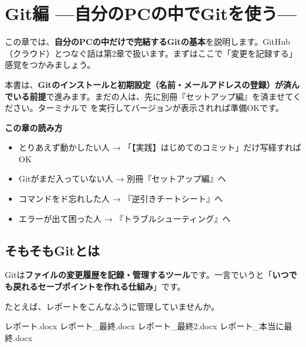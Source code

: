 \chapter{Git編 —自分のPCの中でGitを使う—}

この章では、\textbf{自分のPCの中だけで完結するGitの基本}を説明します。GitHub（クラウド）とつなぐ話は第2章で扱います。まずはここで「変更を記録する」感覚をつかみましょう。

\begin{warnbox}
本書は、\textbf{Gitのインストールと初期設定（名前・メールアドレスの登録）が済んでいる前提}で進みます。まだの人は、先に別冊『セットアップ編』を済ませてください。ターミナルで  を実行してバージョンが表示されれば準備OKです。
\end{warnbox}

\begin{hintbox}
\textbf{この章の読み方}
\begin{itemize}[leftmargin=1.4em, nosep]
  \item とりあえず動かしたい人 → 「【実践】はじめてのコミット」だけ写経すればOK
  \item Gitがまだ入っていない人 → 別冊『セットアップ編』へ
  \item コマンドをド忘れした人 → 『逆引きチートシート』へ
  \item エラーが出て困った人 → 『トラブルシューティング』へ
\end{itemize}
\end{hintbox}

\section{そもそもGitとは}

Gitは\textbf{ファイルの変更履歴を記録・管理するツール}です。一言でいうと「\textbf{いつでも戻れるセーブポイントを作れる仕組み}」です。

たとえば、レポートをこんなふうに管理していませんか。

\begin{codebox}[text]
\begin{code}
レポート.docx
レポート_最終.docx
レポート_最終2.docx
レポート_本当に最終.docx
\end{code}
\end{codebox}

